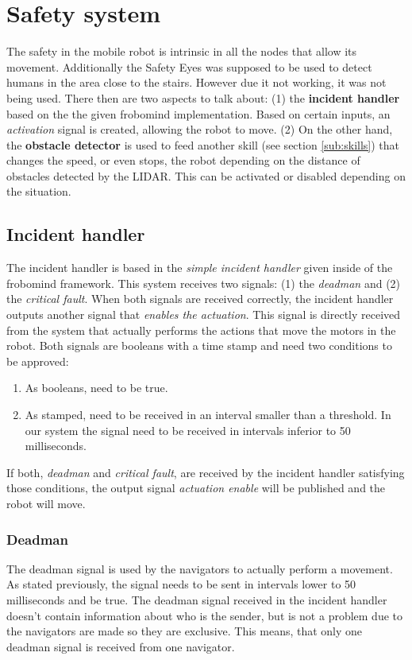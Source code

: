 \section{Safety system} %
\label{sec:mr_safety_system}
The safety in the mobile robot is intrinsic in all the nodes that allow its movement.
Additionally the Safety Eyes was supposed to be used to detect humans in the area close to the stairs. However due it not working, it was not being used.
There then are two aspects to talk about: (1) the \textbf{incident handler} based on the the given frobomind implementation. Based on certain inputs, an \emph{activation} signal is created, allowing the robot to move.
(2) On the other hand, the \textbf{obstacle detector} is used to feed another skill (see section \ref{sub:skills}) that changes the speed, or even stops, the robot depending on the distance of obstacles detected by the LIDAR.
This can be activated or disabled depending on the situation.
	\subsection{Incident handler} %
	\label{sub:mr_incident_handler}
	The incident handler is based in the \emph{simple incident handler} given inside of the frobomind framework.
	This system receives two signals: (1) the \emph{deadman} and (2) the \emph{critical fault}.
	When both signals are received correctly, the incident handler outputs another signal that \emph{enables the actuation}.
	This signal is directly received from the system that actually performs the actions that move the motors in the robot.
	Both signals are booleans with a time stamp and need two conditions to be approved:
	\begin{enumerate}
		\item As booleans, need to be true.
		\item As stamped, need to be received in an interval smaller than a threshold. In our system the signal need to be received in intervals inferior to 50 milliseconds.
	\end{enumerate}
	If both, \emph{deadman} and \emph{critical fault}, are received by the incident handler satisfying those conditions, the output signal \emph{actuation enable} will be published and the robot will move.
		\subsubsection{Deadman} %
		\label{ssub:mr_deadman}
		The deadman signal is used by the navigators to actually perform a movement.
		As stated previously, the signal needs to be sent in intervals lower to 50 milliseconds and be true.
		The deadman signal received in the incident handler doesn't contain information about who is the sender, but is not a problem due to the navigators are made so they are exclusive.
		This means, that only one deadman signal is received from one navigator.

